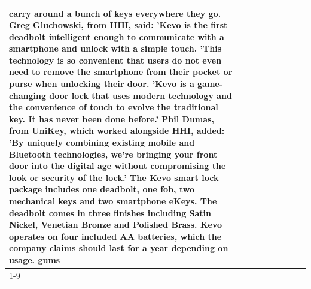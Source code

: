 \begin{table}[H]
\begin{tabular}{lllrlllll}
carry around a bunch of keys everywhere they go. Greg Gluchowski, from HHI, said: 'Kevo is the first deadbolt intelligent enough to communicate with a smartphone and unlock with a simple touch. 'This technology is so convenient that users do not even need to remove the smartphone from their pocket or purse when unlocking their door. 'Kevo is a game-changing door lock that uses modern technology and the convenience of touch to evolve the traditional key. It has never been done before.' Phil Dumas, from UniKey, which worked alongside HHI, added: 'By uniquely combining existing mobile and Bluetooth technologies, we’re bringing your front door into the digital age without compromising the look or security of the lock.' The Kevo smart lock package includes one deadbolt, one fob, two mechanical keys and two smartphone eKeys. The deadbolt comes in three finishes including Satin Nickel, Venetian Bronze and Polished Brass. Kevo operates on four included AA batteries, which the company claims should last for a year depending on usage. gums \\
\cline{1-9}

\end{tabular}
\end{table}

